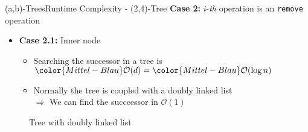 \begin{frame}{(a,b)-Trees}{Runtime Complexity - (2,4)-Tree}
  \textbf{Case 2:}
  {\color{Mittel-Blau}$i$}-\textit{th} operation is an
  \texttt{\color{Mittel-Blau}remove} operation
  \begin{itemize}
    \item
      \textbf{Case 2.1:} Inner node
      \begin{itemize}
        \item
         Searching the successor in a tree is
          \begin{math}
           {\color{Mittel-Blau}\mathcal{O}(d)} =
           {\color{Mittel-Blau}\mathcal{O}(\log n)}
          \end{math}
        \item
          Normally the tree is coupled with a doubly linked list\\
          $\Rightarrow$ We can find the succcessor in
          {\color{Mittel-Blau}$\mathcal{O}(1)$}
    \end{itemize}
  \end{itemize}
  \vspace{0.5em}
  \begin{figure}
    \begin{adjustbox}{width=0.75\linewidth}
      
    \end{adjustbox}
    \caption{Tree with doubly linked list}
    \label{fig:a_b_tree:doubly_linked_list}
  \end{figure}
\end{frame}


